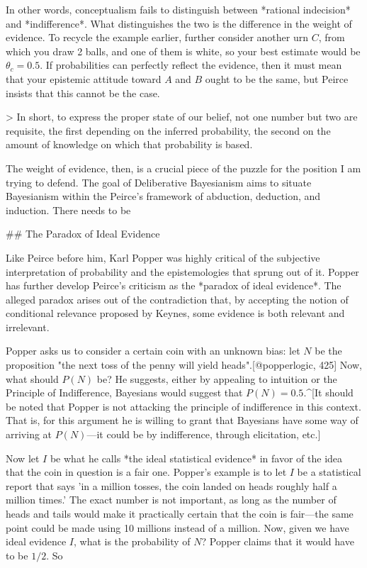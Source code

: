 In other words, conceptualism fails to distinguish between *rational
indecision* and *indifference*. What distinguishes the two is the
difference in the weight of evidence. To recycle the example earlier,
further consider another urn \(C\), from which you draw 2 balls, and one
of them is white, so your best estimate would be \(\theta_c = 0.5\). If
probabilities can perfectly reflect the evidence, then it must mean that
your epistemic attitude toward \(A\) and \(B\) ought to be the same, but
Peirce insists that this cannot be the case.

\textgreater{} In short, to express the proper state of our belief, not
one number but two are requisite, the first depending on the inferred
probability, the second on the amount of knowledge on which that
probability is based.

The weight of evidence, then, is a crucial piece of the puzzle for the
position I am trying to defend. The goal of Deliberative Bayesianism
aims to situate Bayesianism within the Peirce's framework of abduction,
deduction, and induction. There needs to be

\#\# The Paradox of Ideal Evidence

Like Peirce before him, Karl Popper was highly critical of the
subjective interpretation of probability and the epistemologies that
sprung out of it. Popper has further develop Peirce's criticism as the
*paradox of ideal evidence*. The alleged paradox arises out of the
contradiction that, by accepting the notion of conditional relevance
proposed by Keynes, some evidence is both relevant and irrelevant.

Popper asks us to consider a certain coin with an unknown bias: let
\(N\) be the proposition "the next toss of the penny will yield
heads".{[}@popperlogic, 425{]} Now, what should \(P(N)\) be? He
suggests, either by appealing to intuition or the Principle of
Indifference, Bayesians would suggest that \(P(N) = 0.5\).\^{}{[}It
should be noted that Popper is not attacking the principle of
indifference in this context. That is, for this argument he is willing
to grant that Bayesians have some way of arriving at \(P(N)\)---it could
be by indifference, through elicitation, etc.{]}

Now let \(I\) be what he calls *the ideal statistical evidence* in favor
of the idea that the coin in question is a fair one. Popper's example is
to let \(I\) be a statistical report that says 'in a million tosses, the
coin landed on heads roughly half a million times.' The exact number is
not important, as long as the number of heads and tails would make it
practically certain that the coin is fair---the same point could be made
using 10 millions instead of a million. Now, given we have ideal
evidence \(I\), what is the probability of \(N\)? Popper claims that it
would have to be \(1/2\). So

